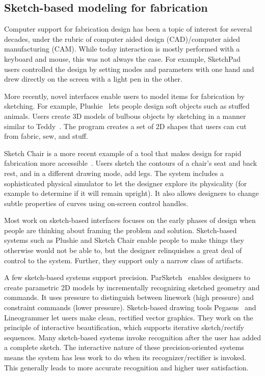 \documentclass{article}
\begin{document}
\subsection{Sketch-based modeling for fabrication}

Computer support for fabrication design has been a topic of interest
for several decades, under the rubric of computer aided design
(CAD)/computer aided manufacturing (CAM). While today interaction is
mostly performed with a keyboard and mouse, this was not always the
case. For example, SketchPad~\cite{sutherland-sketchpad} users
controlled the design by setting modes and parameters with one hand
and drew directly on the screen with a light pen in the other.

More recently, novel interfaces enable users to model items for
fabrication by sketching. For example, Plushie~\cite{mori-plushie}
lets people design soft objects such as stuffed animals. Users create
3D models of bulbous objects by sketching in a manner similar to
Teddy~\cite{igarashi-teddy}. The program creates a set of 2D shapes
that users can cut from fabric, sew, and stuff.

Sketch Chair is a more recent example of a tool that makes design for
rapid fabrication more accessible~\cite{saul-sketch-chair}. Users
sketch the contours of a chair's seat and back rest, and in a
different drawing mode, add legs. The system includes a sophisticated
physical simulator to let the designer explore its physicality (for
example to determine if it will remain upright). It also allows
designers to change subtle properties of curves using on-screen
control handles.

Most work on sketch-based interfaces focuses on the early phases of
design when people are thinking about framing the problem and
solution. Sketch-based systems such as Plushie and Sketch Chair enable
people to make things they otherwise would not be able to, but the
designer relinquishes a great deal of control to the system. Further,
they support only a narrow class of artifacts.

A few sketch-based systems support
precision. ParSketch~\cite{naya-parsketch} enables designers to create
parametric 2D models by incrementally recognizing sketched geometry
and commands. It uses pressure to distinguish between linework (high
pressure) and constraint commands (lower pressure). Sketch-based
drawing tools Pegasus~\cite{igarashi-pegasus} and Lineogrammer let
users make clean, rectified vector graphics. They work on the
principle of interactive beautification, which supports iterative
sketch/rectify sequences. Many sketch-based systems invoke recognition
after the user has added a complete sketch. The interactive nature of
these precision-oriented systems means the system has less work to do
when its recognizer/rectifier is invoked. This generally leads to more
accurate recognition and higher user satisfaction.
\end{document}
